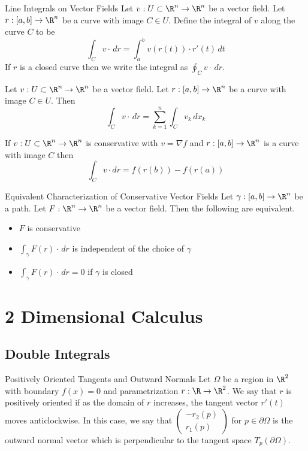 \documentclass[a4paper]{article}
\begin{document}
\begin{defn}{Line Integrals on Vector Fields}{} Let $v:U\subset\R^n\to\R^n$ be a vector field. Let $r:[a,b]\to\R^n$ be a curve with image $C\in U$. Define the integral of $v$ along the curve $C$ to be $$\int_Cv\cdot\,dr=\int_a^bv(r(t))\cdot r'(t)\,dt$$ If $r$ is a closed curve then we write the integral as $\oint_Cv\cdot\,dr$. 
\end{defn}

\begin{prp}{}{} Let $v:U\subset\R^n\to\R^n$ be a vector field. Let $r:[a,b]\to\R^n$ be a curve with image $C\in U$. Then $$\int_Cv\cdot\,dr=\sum_{k=1}^n\int_Cv_k\,dx_k$$
\end{prp}

\begin{prp}{}{} If $v:U\subset\R^n\to\R^n$ is conservative with $v=\nabla f$ and $r:[a,b]\to\R^n$ is a curve with image $C$ then $$\int_Cv\cdot dr=f(r(b))-f(r(a))$$
\end{prp}

\begin{thm}{Equivalent Characterization of Conservative Vector Fields}{} Let $\gamma:[a,b]\to\R^n$ be a path. Let $F:\R^n\to\R^n$ be a vector field. Then the following are equivalent. 
\begin{itemize}
\item $F$ is conservative
\item $\int_\gamma F(r)\cdot \,dr$ is independent of the choice of $\gamma$
\item $\int_\gamma F(r)\cdot \,dr=0$ if $\gamma$ is closed
\end{itemize}
\end{thm}

\pagebreak

\section{2 Dimensional Calculus}
\subsection{Double Integrals}
\begin{defn}{Positively Oriented Tangents and Outward Normals}{} Let $\Omega$ be a region in $\R^2$ with boundary $f(x)=0$ and parametrization $r:\R\to\R^2$. We say that $r$ is positively oriented if as the domain of $r$ increases, the tangent vector $r'(t)$ moves anticlockwise. In this case, we say that $\begin{pmatrix}-r_2(p)\\r_1(p)\end{pmatrix}$ for $p\in\partial\Omega$ is the outward normal vector which is perpendicular to the tangent space $T_p(\partial\Omega)$. 
\end{defn}
\end{document}
